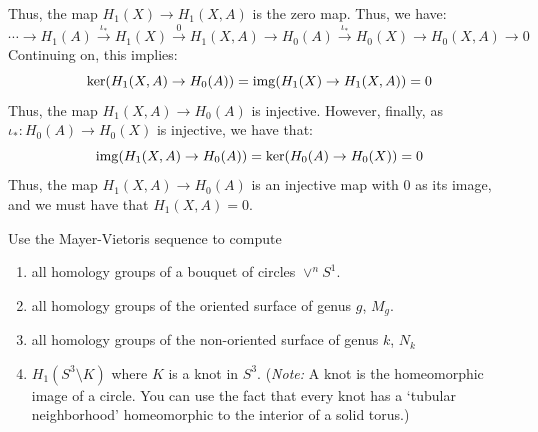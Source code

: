 \documentclass[12pt]{article}
\begin{document}
\begin{solution}
\begin{enumerate}
        Thus, the map $H_1(X) \to H_1(X, A)$ is the zero map. Thus, we have:
        \[ \cdots \to H_1(A) \xrightarrow{\iota_*} H_1(X) \xrightarrow{0} H_1(X, A) \to H_0(A) \xrightarrow{\iota_*} H_0(X) \to H_0(X, A) \to 0 \]   
        Continuing on, this implies:
        \[ \ker(H_1(X, A) \to H_0(A)) = \operatorname{img}(H_1(X) \to H_1(X, A)) = 0\]
        Thus, the map $H_1(X, A) \to H_0(A)$ is injective. However, finally, as $\iota_*: H_0(A) \to H_0(X)$ is injective, we have that:
        \[\operatorname{img}(H_1(X, A) \to H_0(A)) = \ker(H_0(A) \to H_0(X)) = 0\]
        Thus, the map $H_1(X, A) \to H_0(A)$ is an injective map with $0$ as its image, and we must have that $H_1(X, A) = 0$.
    \end{enumerate}
\end{solution}
\newpage


\begin{problem}{4}
    Use the Mayer-Vietoris sequence to compute
    \begin{enumerate}
        \item all homology groups of a bouquet of circles $\vee^n S^1$.  
        \item all homology groups of the oriented surface of genus $g$, $M_g$. 
        \item all homology groups of the non-oriented surface of genus $k$, $N_k$
        \item $H_1(S^3 \setminus K)$ where $K$ is a knot in $S^3$. (\emph{Note:} A knot is the homeomorphic image of a circle. You can use the fact that every knot has a `tubular neighborhood' homeomorphic to the interior of a solid torus.)
    \end{enumerate}
\end{problem}
\end{document}
